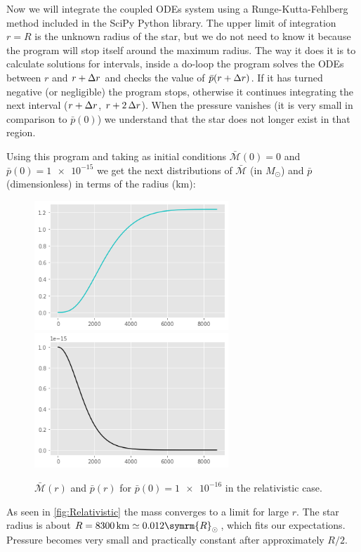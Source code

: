 \documentclass[a4paper]{article}
\newcommand\Mbar{\bar{\mathcal{M}}}
\newcommand\Msun{M_{\odot}}
\begin{document}
Now we will integrate the coupled ODEs system using a Runge-Kutta-Fehlberg method included in the SciPy Python library.  The upper limit of integration $r = R$ is the unknown radius of the star, but we do not need to know it because the program will stop itself around the maximum radius. The way it does it is to calculate solutions for intervals, inside a do-loop the program solves the ODEs between $r$ and $r + \adif{r}$ and checks the value of $\bar{p}(r + \adif{r})$. If it has turned negative (or negligible) the program stops, otherwise it continues integrating the next interval ($r + \adif{r}$, $r + 2\adif{r}$). When the pressure vanishes (it is very small in comparison to $\bar{p}(0)$) we understand that the star does not longer exist in that region.

Using this program and taking as initial conditions $\Mbar(0) = 0$ and $\bar{p}(0) = \num{1e-15}$ we get the next distributions of $\Mbar$ (in $\Msun $) and $\bar{p}$ (dimensionless) in terms of the radius (km): 
\begin{figure}[h]
    \includegraphics[width=7.3cm]{images/M-r Rel.png}
    \includegraphics[width=7.3cm]{images/p-r Rel.png}
    \centering
    \caption{$\Mbar(r)$ and $\bar{p}(r)$ for $\bar{p}(0) =\num{1e-16}$ in the relativistic case.}\label{fig:Relativistic}
\end{figure}

As seen in \autoref{fig:Relativistic} the mass  converges to a limit for large $r$. The star radius is about $R = \qty{8300}{km} \simeq 0.012 \symrm{R}_\odot$, which fits our expectations. Pressure becomes very small and practically constant after approximately $R/2$.
\end{document}
